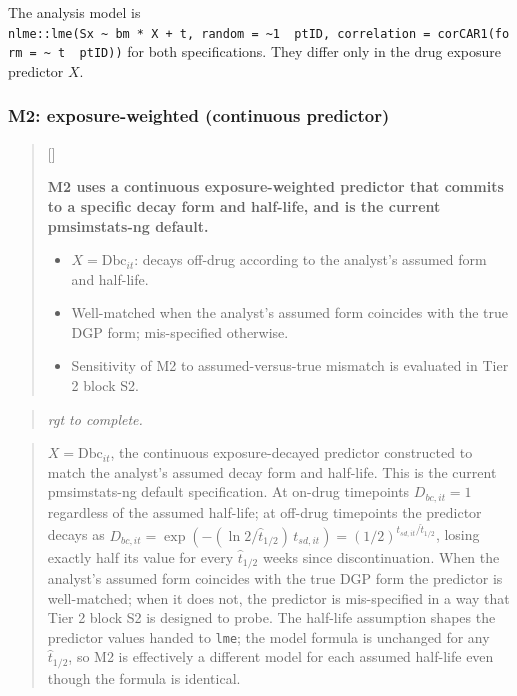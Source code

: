 \documentclass[
  11pt,
]{article}
\newcounter{pgraph}
\newenvironment{bullets}{%
  \stepcounter{pgraph}%
  \begin{quote}\small\sffamily\color[gray]{0.30}%
  {\normalfont\scriptsize\color[gray]{0.58}[\thepgraph]\enspace}}{%
  \end{quote}}
\newenvironment{rgt}{%
  \begin{quote}\small\itshape\color[RGB]{20,60,160}}{%
  \end{quote}}
\newenvironment{orig}{%
  \begin{quote}\normalsize\color[gray]{0.55}}{%
  \end{quote}}
\begin{document}
The analysis model is \texttt{nlme::lme(Sx\ \textasciitilde{}\ bm\ *\ X\ +\ t,\ random\ =\ \textasciitilde{}1\ \textbar{}\ ptID,\ correlation\ =\ corCAR1(form\ =\ \textasciitilde{}\ t\ \textbar{}\ ptID))} for both
specifications. They differ only in the drug exposure predictor \(X\).

\subsubsection{M2: exposure-weighted (continuous predictor)}\label{m2-exposure-weighted-continuous-predictor}

\begin{bullets}

\textbf{M2 uses a continuous exposure-weighted predictor that
commits to a specific decay form and half-life, and is the current
pmsimstats-ng default.}

\begin{itemize}\setlength{\itemsep}{2pt}\setlength{\parskip}{0pt}
\item $X = \text{Dbc}_{it}$: decays off-drug according to the
analyst's assumed form and half-life.
\item Well-matched when the analyst's assumed form coincides with
the true DGP form; mis-specified otherwise.
\item Sensitivity of M2 to assumed-versus-true mismatch is evaluated
in Tier 2 block S2.
\end{itemize}

\end{bullets}

\begin{rgt}
rgt to complete.

\end{rgt}

\begin{orig}
\(X = \text{Dbc}_{it}\), the continuous exposure-decayed predictor
constructed to match the analyst's assumed decay form and half-life.
This is the current pmsimstats-ng default specification. At on-drug
timepoints \(D_{bc,it} = 1\) regardless of the assumed half-life; at
off-drug timepoints the predictor decays as
\(D_{bc,it} = \exp(-(\ln 2/\hat{t}_{1/2})\,t_{sd,it}) =
(1/2)^{t_{sd,it}/\hat{t}_{1/2}}\), losing exactly half its value for
every \(\hat{t}_{1/2}\) weeks since discontinuation. When the analyst's
assumed form coincides with the true DGP form the predictor is
well-matched; when it does not, the predictor is mis-specified in a
way that Tier 2 block S2 is designed to probe. The half-life
assumption shapes the predictor values handed to \texttt{lme}; the model
formula is unchanged for any \(\hat{t}_{1/2}\), so M2 is effectively a
different model for each assumed half-life even though the formula
is identical.

\end{orig}
\end{document}
